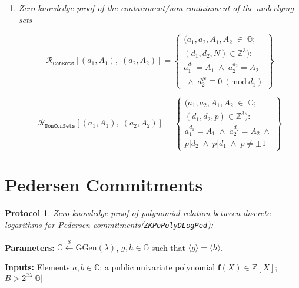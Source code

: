 \documentclass[11pt, lettersize, notitlepage, leqno, footskip=0.6cm]{article}
\newcommand{\bz}{\mathbb Z}
\newcommand{\ttt}{\texttt}
\newcommand{\bG}{\mathbb{G}}
\newcommand{\sett}{\ttt{Set}}
\newcommand{\la}{\langle}
\newcommand{\ra}{\rangle}
\newcommand{\mc}{\mathcal}
\newcommand{\mb}{\mathbb}
\newcommand{\mbf}{\mathbf}
\newcommand{\mr}{\mathrm}
\newcommand{\lam}{\lambda}
\newcommand{\lamb}{\lambda}
\newcommand{\sub}{\subseteq}
\newcommand{\mcM}{\mc{M}}
\newcommand{\noin}{\noindent}
\newcommand{\Mod}[1]{\ (\mathrm{mod}\ #1)}
\newtheorem{Prot}[Thm]{Protocol}
\numberwithin{equation}{section}
\begin{document}
{{{\begin{enumerate}[wide, labelwidth=!, labelindent=0pt]
\item \hyperlink{Sets}{\textit{Zero-knowledge proof of the containment/non-containment of the underlying sets}}\vspace{-0.3cm}


\[
  \mc{R}_{\ttt{ConSets}}[(a_1, A_1),\;(a_2,A_2)] = \left\{\begin{array}{l}
    (a_1,a_2, A_1, A_2\;\in\;\mb{G}; \\
    (d_1, d_2, N) \in \bz^3):   \\
    a_1^{d_1} = A_1\;\wedge\;a_2^{d_2} = A_2\\
    \;\wedge\;d_2^{N}\equiv 0\Mod{d_1} 
  \end{array}\right\}
\]


\[
  \mc{R}_{\ttt{NonConSets}}[(a_1, A_1),\;(a_2,A_2)] = \left\{\begin{array}{l}
    (a_1,a_2, A_1, A_2\;\in\;\mb{G}; \\
    (d_1, d_2, p) \in \bz^3):   \\
    a_1^{d_1} = A_1\;\wedge\;a_2^{d_2} = A_2\;\wedge\\
   p \big| d_2\; \wedge\; p \big| d_1 \; \wedge\; p\neq \pm 1 
  \end{array}\right\}
\]


\end{enumerate}



\section{\fontsize{11}{11}\selectfont Pedersen Commitments}


\begin{Prot} \normalfont \hypertarget{PolyPed}{\textit{Zero knowledge proof of polynomial relation between discrete logarithms for Pedersen commitments}}(\verb|ZKPoPolyDLogPed|):\end{Prot} \vspace{-0.3cm}

\noin \textbf{Parameters:} $\mb{G}\xleftarrow{\$} \mr{GGen}(\lamb)$,  $g,h\in \mb{G}$ such that $\la g \ra = \la h \ra$.

\noin \textbf{Inputs:} Elements $a,b \in \mb{G}$; a public univariate polynomial $\mbf{f}(X)\in \bz[X]$; $B > 2^{2\lam}|\bG|$

}}}
\end{document}
